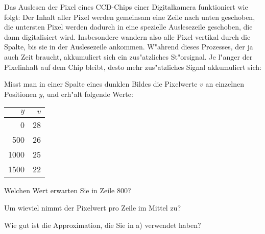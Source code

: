 Das Auslesen der Pixel eines CCD-Chips einer Digitalkamera funktioniert
wie folgt: Der Inhalt aller Pixel werden gemeinsam eine Zeile nach unten
geschoben,
die untersten Pixel werden dadurch in eine spezielle Auslesezeile geschoben,
die dann digitalisiert wird. Insbesondere wandern also alle Pixel vertikal
durch die Spalte, bis sie in der Auslesezeile ankommen.
W"ahrend dieses Prozesses, der ja auch Zeit braucht, akkumuliert sich
ein zus"atzliches St"orsignal. Je l"anger der Pixelinhalt auf dem Chip
bleibt, desto mehr zus"atzliches Signal akkumuliert sich:
\begin{center}
\end{center}
Misst man in einer Spalte eines dunklen Bildes die Pixelwerte $v$ an
einzelnen Positionen $y$, und erh"alt folgende Werte:
\begin{center}
\begin{tabular}{|r|r|}
\hline
$y$&$v$\\
\hline
   0& 28\\
 500& 26\\
1000& 25\\
1500& 22\\
\hline
\end{tabular}
\end{center}
\begin{teilaufgaben}
\item Welchen Wert erwarten Sie in Zeile 800?
\item Um wieviel nimmt der Pixelwert pro Zeile im Mittel zu?
\item Wie gut ist die Approximation, die Sie in a) verwendet haben?
\end{teilaufgaben}

